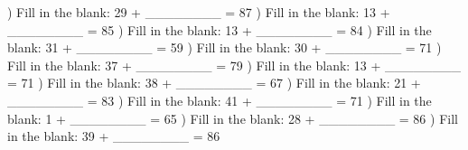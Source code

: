 \documentclass{article}%
\begin{document}
) Fill in the blank: 29 + \_\_\_\_\_\_\_\_ = 87%
\newline%
\newline%
) Fill in the blank: 13 + \_\_\_\_\_\_\_\_ = 85%
\newline%
\newline%
) Fill in the blank: 13 + \_\_\_\_\_\_\_\_ = 84%
\newline%
\newline%
) Fill in the blank: 31 + \_\_\_\_\_\_\_\_ = 59%
\newline%
\newline%
) Fill in the blank: 30 + \_\_\_\_\_\_\_\_ = 71%
\newline%
\newline%
) Fill in the blank: 37 + \_\_\_\_\_\_\_\_ = 79%
\newline%
\newline%
) Fill in the blank: 13 + \_\_\_\_\_\_\_\_ = 71%
\newline%
\newline%
) Fill in the blank: 38 + \_\_\_\_\_\_\_\_ = 67%
\newline%
\newline%
) Fill in the blank: 21 + \_\_\_\_\_\_\_\_ = 83%
\newline%
\newline%
) Fill in the blank: 41 + \_\_\_\_\_\_\_\_ = 71%
\newline%
\newline%
) Fill in the blank: 1 + \_\_\_\_\_\_\_\_ = 65%
\newline%
\newline%
) Fill in the blank: 28 + \_\_\_\_\_\_\_\_ = 86%
\newline%
\newline%
) Fill in the blank: 39 + \_\_\_\_\_\_\_\_ = 86%
\newline%
\newline%
\end{document}
